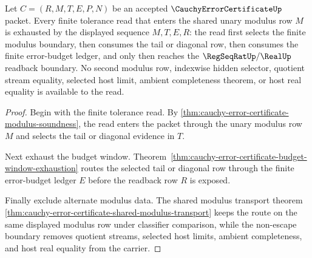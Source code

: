 \begin{theorem}
\label{thm:cauchy-error-certificate-shared-modulus-exhaustion}
Let $C=(R,M,T,E,P,N)$ be an accepted $\CauchyErrorCertificateUp$ packet. Every finite tolerance read that enters the shared unary modulus row $M$ is exhausted by the displayed sequence $M,T,E,R$: the read first selects the finite modulus boundary, then consumes the tail or diagonal row, then consumes the finite error-budget ledger, and only then reaches the $\RegSeqRatUp/\RealUp$ readback boundary. No second modulus row, indexwise hidden selector, quotient stream equality, selected host limit, ambient completeness theorem, or host real equality is available to the read.
\end{theorem}
\begin{proof}
Begin with the finite tolerance read. By \autoref{thm:cauchy-error-certificate-modulus-soundness}, the read enters the packet through the unary modulus row $M$ and selects the tail or diagonal evidence in $T$.

Next exhaust the budget window. Theorem~\ref{thm:cauchy-error-certificate-budget-window-exhaustion} routes the selected tail or diagonal row through the finite error-budget ledger $E$ before the readback row $R$ is exposed.

Finally exclude alternate modulus data. The shared modulus transport theorem \autoref{thm:cauchy-error-certificate-shared-modulus-transport} keeps the route on the same displayed modulus row under classifier comparison, while the non-escape boundary removes quotient streams, selected host limits, ambient completeness, and host real equality from the carrier.
\end{proof}

